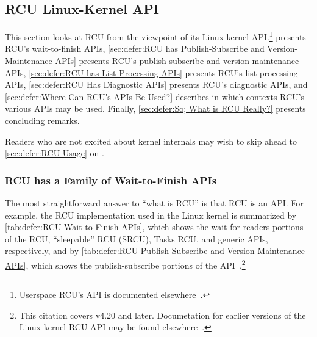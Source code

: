 
\subsection{RCU Linux-Kernel API}
\label{sec:defer:RCU Linux-Kernel API}

This section looks at RCU from the viewpoint of its Linux-kernel API\@.\footnote{
	Userspace RCU's API is documented
	elsewhere~\cite{PaulMcKenney2013LWNURCU}.}
presents RCU's wait-to-finish APIs,
\cref{sec:defer:RCU has Publish-Subscribe and Version-Maintenance APIs}
presents RCU's publish-subscribe and version-maintenance APIs,
\cref{sec:defer:RCU has List-Processing APIs}
presents RCU's list-processing APIs,
\cref{sec:defer:RCU Has Diagnostic APIs}
presents RCU's diagnostic APIs, and
\cref{sec:defer:Where Can RCU's APIs Be Used?}
describes in which contexts RCU's various APIs may be used.
Finally,
\cref{sec:defer:So; What is RCU Really?}
presents concluding remarks.

Readers who are not excited about kernel internals may wish to skip
ahead to \cref{sec:defer:RCU Usage}
on .

\subsubsection{RCU has a Family of Wait-to-Finish APIs}
\label{sec:defer:RCU has a Family of Wait-to-Finish APIs}

The most straightforward answer to ``what is RCU'' is that RCU is
an API\@.
For example, the RCU implementation used in the Linux kernel is
summarized by
\cref{tab:defer:RCU Wait-to-Finish APIs},
which shows the wait-for-readers portions of the RCU, ``sleepable'' RCU
(SRCU), Tasks RCU, and generic APIs, respectively,
and by
\cref{tab:defer:RCU Publish-Subscribe and Version Maintenance APIs},
which shows the publish-subscribe portions of the
API~\cite{PaulEMcKenney2019RCUAPI}.\footnote{
	This citation covers v4.20 and later.
	Documetation for earlier versions of the Linux-kernel RCU API may
	be found elsewhere~\cite{PaulEMcKenney2008WhatIsRCUAPI,PaulEMcKenney2014RCUAPI}.}

